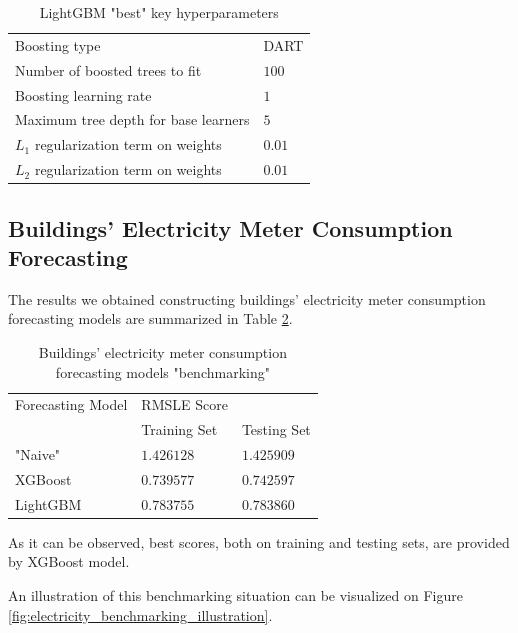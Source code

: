 \documentclass[twocolumn, switch]{article}
\begin{document}
\begin{table}[H]
\caption{LightGBM "best" key hyperparameters}
\centering
\begin{tabular}{ll}
\toprule
Boosting type & DART \\
Number of boosted trees to fit & $100$ \\
Boosting learning rate & $1$ \\
Maximum tree depth for base learners & $5$ \\
$L_1$ regularization term on weights & $0.01$ \\
$L_2$ regularization term on weights & $0.01$ \\
\bottomrule
\end{tabular}
\label{tab:lightgbm_hyperparameters}
\end{table}

\subsection{Buildings' Electricity Meter Consumption Forecasting}

The results we obtained constructing buildings' electricity meter consumption forecasting models are summarized in Table \ref{tab:electricity_benchmarking}.

\begin{table}[H]
\caption{Buildings' electricity meter consumption forecasting models "benchmarking"}
\centering
\begin{tabular}{lll}
\toprule
Forecasting Model & RMSLE Score & \\
& Training Set & Testing Set \\
\midrule
"Naive" & $1.426128$ & $1.425909$ \\
XGBoost & $0.739577$ & $0.742597$ \\
LightGBM & $0.783755$ & $0.783860$ \\
\bottomrule
\end{tabular}
\label{tab:electricity_benchmarking}
\end{table}

As it can be observed, best scores, both on training and testing sets, are provided by XGBoost model.

An illustration of this benchmarking situation can be visualized on Figure \ref{fig:electricity_benchmarking_illustration}.
\end{document}
